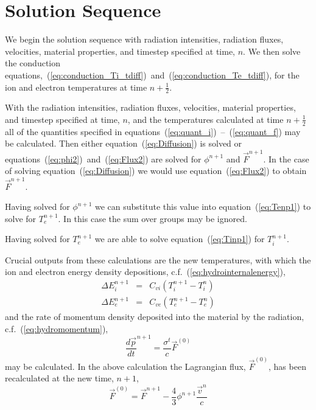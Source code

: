\documentclass{article}
\begin{document}
\section{Solution Sequence}

We begin the solution sequence with radiation intensities,
radiation fluxes, velocities,
material properties, and timestep specified at time, $n$.
We then solve the conduction
equations,~(\ref{eq:conduction_Ti_tdiff})~and~(\ref{eq:conduction_Te_tdiff}),
for the ion and electron temperatures at time $n+\frac{1}{2}$.

With the radiation intensities,
radiation fluxes, velocities,
material properties, and timestep specified at time, $n$,
and the temperatures calculated at time $n+\frac{1}{2}$
all of the quantities specified in
equations~(\ref{eq:quant_i})~--~(\ref{eq:quant_f}) may be calculated.
Then either equation~(\ref{eq:Diffusion}) is
solved or equations~(\ref{eq:phi2})~and~(\ref{eq:Flux2}) are solved for
$\phi^{n+1}$ and $\vec{F}^{n+1}$.
In the case of solving equation~(\ref{eq:Diffusion}) we would use
equation~(\ref{eq:Flux2}) to obtain $\vec{F}^{n+1}$.

Having solved for $\phi^{n+1}$ we can substitute this
value into equation~(\ref{eq:Tenp1}) to solve for $T_{e}^{n+1}$.
In this case the sum over groups may be ignored.

Having solved
for $T_{e}^{n+1}$ we are able to
solve equation~(\ref{eq:Tinp1}) for $T_{i}^{n+1}$.

Crucial outputs from these calculations are
the new temperatures, with which the ion and electron
energy density depositions,
c.f.~(\ref{eq:hydrointernalenergy}),
\begin{eqnarray}
        \Delta E_{i}^{n+1} &=& C_{vi} ( T_{i}^{n+1} - T_{i}^{n})
  \\
        \Delta E_{e}^{n+1} &=& C_{ve} ( T_{e}^{n+1} - T_{e}^{n})
\end{eqnarray}
and the rate of momentum density
deposited into the material by the radiation,
c.f.~(\ref{eq:hydromomentum}),
\begin{equation}
   {\frac{d\vec{p}}{dt}}^{n+1} = \frac{\sigma^{t}}{c} \vec{F}^{(0)}
\end{equation}
may be calculated.
In the above calculation
the Lagrangian flux, $\vec{F}^{(0)}$, has been recalculated at the
new time, $n+1$,
\begin{equation}
   \vec{F}^{(0)} = \vec{F}^{n+1} - \frac{4}{3} \phi^{n+1}
                                                \frac{\vec{v}^{n}}{c}
\end{equation}
\end{document}
